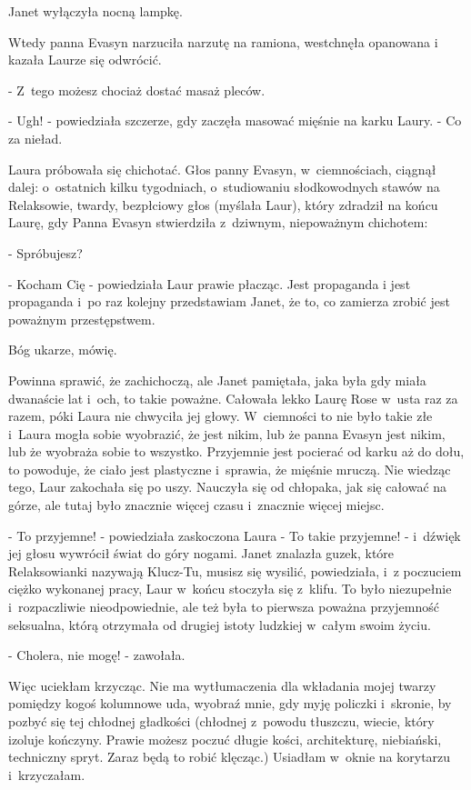 \documentclass[oneside,polish,12pt,sfheadings]{mwbk}
\begin{document}
Janet wyłączyła nocną lampkę.

Wtedy panna Evasyn narzuciła narzutę na ramiona, westchnęła opanowana
i kazała Laurze się odwrócić. 

- Z~tego możesz chociaż dostać masaż
pleców.

- Ugh! - powiedziała szczerze, gdy zaczęła masować mięśnie na karku
Laury. - Co za nieład.

Laura próbowała się chichotać. Głos panny Evasyn, w~ciemnościach,
ciągnął dalej: o~ostatnich kilku tygodniach, o~studiowaniu słodkowodnych
stawów na Relaksowie, twardy, bezpłciowy głos (myślała Laur), który
zdradził na końcu Laurę, gdy Panna Evasyn stwierdziła z~dziwnym, niepoważnym
chichotem: 

- Spróbujesz?

- Kocham Cię - powiedziała Laur prawie płacząc. Jest propaganda i
jest propaganda i~po raz kolejny przedstawiam Janet, że to, co zamierza
zrobić jest poważnym przestępstwem.

Bóg ukarze, mówię.

Powinna sprawić, że zachichoczą, ale Janet pamiętała, jaka była gdy
miała dwanaście lat i~och, to takie poważne. Całowała lekko Laurę
Rose w~usta raz za razem, póki Laura nie chwyciła jej głowy. W~ciemności
to nie było takie złe i~Laura mogła sobie wyobrazić, że jest nikim,
lub że panna Evasyn jest nikim, lub że wyobraża sobie to wszystko.
Przyjemnie jest pocierać od karku aż do dołu, to powoduje, że ciało
jest plastyczne i~sprawia, że mięśnie mruczą. Nie wiedząc tego, Laur
zakochała się po uszy. Nauczyła się od chłopaka, jak się całować na
górze, ale tutaj było znacznie więcej czasu i~znacznie więcej miejsc.

- To przyjemne! - powiedziała zaskoczona Laura - To takie przyjemne!
- i~dźwięk jej głosu wywrócił świat do góry nogami. Janet znalazła
guzek, które Relaksowianki nazywają Klucz-Tu, musisz się wysilić,
powiedziała, i~z poczuciem ciężko wykonanej pracy, Laur w~końcu stoczyła
się z~klifu. To było niezupełnie i~rozpaczliwie nieodpowiednie, ale
też była to pierwsza poważna przyjemność seksualna, którą otrzymała
od drugiej istoty ludzkiej w~całym swoim życiu.

- Cholera, nie mogę! - zawołała.

Więc uciekłam krzycząc. Nie ma wytłumaczenia dla wkładania mojej twarzy
pomiędzy kogoś kolumnowe uda, wyobraź mnie, gdy myję policzki i~skronie,
by pozbyć się tej chłodnej gładkości (chłodnej z~powodu tłuszczu,
wiecie, który izoluje kończyny. Prawie możesz poczuć długie kości,
architekturę, niebiański, techniczny spryt. Zaraz będą to robić klęcząc.)
Usiadłam w~oknie na korytarzu i~krzyczałam.
\end{document}
